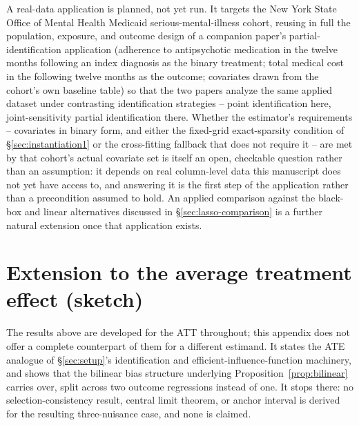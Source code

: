 \documentclass[12pt]{article}
\begin{document}
A real-data application is planned, not yet run. It targets the New York State Office of Mental Health Medicaid serious-mental-illness cohort, reusing in full the population, exposure, and outcome design of a companion paper's partial-identification application (adherence to antipsychotic medication in the twelve months following an index diagnosis as the binary treatment; total medical cost in the following twelve months as the outcome; covariates drawn from the cohort's own baseline table) so that the two papers analyze the same applied dataset under contrasting identification strategies -- point identification here, joint-sensitivity partial identification there. Whether the estimator's requirements -- covariates in binary form, and either the fixed-grid exact-sparsity condition of \S\ref{sec:instantiation1} or the cross-fitting fallback that does not require it -- are met by that cohort's actual covariate set is itself an open, checkable question rather than an assumption: it depends on real column-level data this manuscript does not yet have access to, and answering it is the first step of the application rather than a precondition assumed to hold. An applied comparison against the black-box and linear alternatives discussed in \S\ref{sec:lasso-comparison} is a further natural extension once that application exists.

\appendix

\section{Extension to the average treatment effect (sketch)}
\label{app:ate}

The results above are developed for the ATT throughout; this appendix does not offer a complete
counterpart of them for a different estimand. It states the ATE analogue of \S\ref{sec:setup}'s
identification and efficient-influence-function machinery, and shows that the bilinear bias
structure underlying Proposition~\ref{prop:bilinear} carries over, split across two outcome
regressions instead of one. It stops there: no selection-consistency result, central limit
theorem, or anchor interval is derived for the resulting three-nuisance case, and none is claimed.
\end{document}

